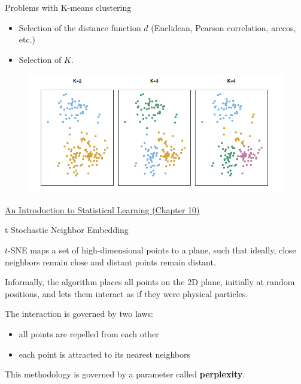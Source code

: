 \documentclass{beamer}
\begin{document}
\begin{frame}{Problems with K-means clustering}
	\begin{itemize}

		\item Selection of the distance function $d$ (Euclidean, Pearson correlation, arccos, etc.) 
		\item Selection of $K$.
	\end{itemize}
	\begin{figure}[h]
	\centering
	\includegraphics[scale=0.55]{../../Figures/kmeans_K.png}
\end{figure}	
\href{https://www.statlearning.com/}{An Introduction to Statistical Learning (Chapter 10)}	
	
\end{frame}
	
\begin{frame}{t Stochastic Neighbor Embedding}

$t$-SNE maps a set of high-dimensional points to a plane, such that ideally, close neighbors remain close and distant points remain distant.

 Informally, the algorithm places all
points on the 2D plane, initially at random positions, and lets them
interact as if they were physical particles. 

The interaction is governed
by two laws: 
\begin{itemize} 
	\item all points are repelled from each other
\item each point is attracted to its nearest neighbors
\end{itemize}
This methodology is governed by a parameter called {\bf perplexity}.

\end{frame}	
\end{document}
